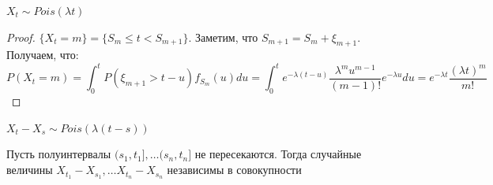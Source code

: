 \begin{theorem}
    \(X_t \sim Pois(\lambda t)\)
\end{theorem}
\begin{proof}
    \(\{X_t = m\} = \{S_m \le t < S_{m + 1}\}\). Заметим, что \(S_{m + 1} = S_m + \xi_{m + 1}\). Получаем, что:
    \[P(X_t = m) = \int_0^t P(\xi_{m + 1} > t - u)f_{S_m}(u)du = \int_0^t e^{-\lambda (t - u)}\frac{\lambda^mu^{m - 1}}{(m - 1)!}e^{-\lambda u}du = e^{-\lambda t}\frac{(\lambda t)^m}{m!}\]
\end{proof}

\begin{theorem}
    \(X_t - X_s \sim Pois(\lambda (t - s))\)
\end{theorem}

\begin{theorem}
    Пусть полуинтервалы \((s_1, t_1], \dots (s_n, t_n]\) не пересекаются. Тогда случайные величины \(X_{t_1} - X_{s_1}, \dots X_{t_n} - X_{s_n}\) независимы в совокупности
\end{theorem}
